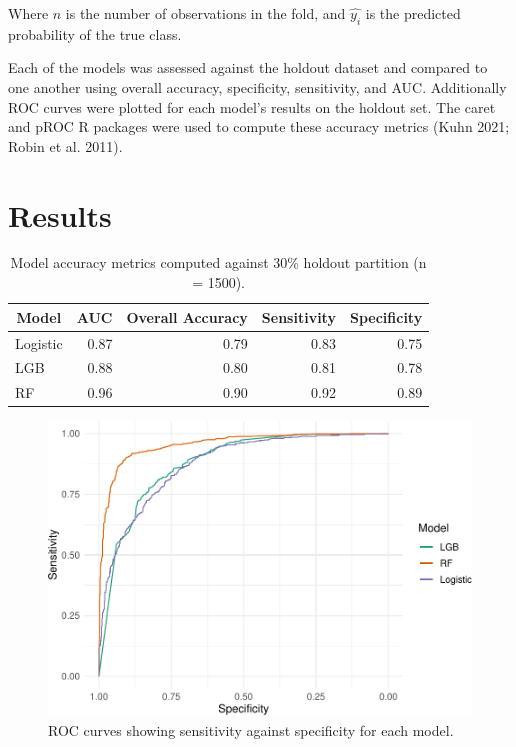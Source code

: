 \documentclass[]{elsarticle} %
\begin{document}
Where \(n\) is the number of observations in the fold, and \(\hat{y_i}\) is
the predicted probability of the true class.

Each of the models was assessed against the holdout dataset and compared to one
another using overall accuracy, specificity, sensitivity, and AUC.
Additionally ROC curves were plotted for each model's results on the holdout
set.
The caret and pROC R packages were used to compute these accuracy metrics
(Kuhn 2021; Robin et al. 2011).

\hypertarget{results}{%
\section{Results}\label{results}}

\begin{table}

\caption{\label{tab:metrics}Model accuracy metrics computed against 30\% holdout partition (n = 1500).}
\centering
\fontsize{12}{14}\selectfont
\begin{tabular}[t]{lrrrr}
\toprule
\multicolumn{1}{c}{Model} & \multicolumn{1}{c}{AUC} & \multicolumn{1}{c}{Overall Accuracy} & \multicolumn{1}{c}{Sensitivity} & \multicolumn{1}{c}{Specificity}\\
\midrule
Logistic & 0.87 & 0.79 & 0.83 & 0.75\\
\addlinespace
LGB & 0.88 & 0.80 & 0.81 & 0.78\\
\addlinespace
RF & 0.96 & 0.90 & 0.92 & 0.89\\
\bottomrule
\end{tabular}
\end{table}

\begin{figure}
\centering
\includegraphics{report_files/figure-latex/auc-1.pdf}
\caption{\label{fig:auc}ROC curves showing sensitivity against specificity for each model.}
\end{figure}
\end{document}
